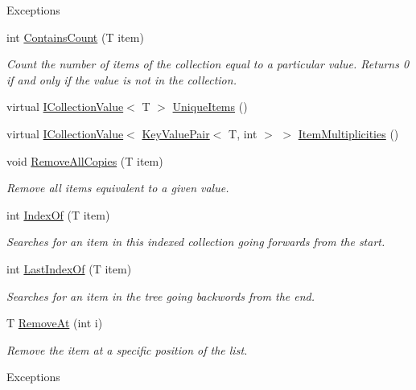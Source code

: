 \begin{DoxyCompactItemize}
\begin{DoxyCompactList}
\begin{DoxyExceptions}{Exceptions}
\hline
\end{DoxyExceptions}
\end{DoxyCompactList}\item 
int \hyperlink{class_c5_1_1_tree_bag_a3a7a0f7538cd89da7e9b10e3311bd521}{Contains\+Count} (T item)
\begin{DoxyCompactList}\small\item\em Count the number of items of the collection equal to a particular value. Returns 0 if and only if the value is not in the collection. \end{DoxyCompactList}\item 
virtual \hyperlink{interface_c5_1_1_i_collection_value}{I\+Collection\+Value}$<$ T $>$ \hyperlink{class_c5_1_1_tree_bag_abae751027448f33475f6fc68f53fa118}{Unique\+Items} ()
\item 
virtual \hyperlink{interface_c5_1_1_i_collection_value}{I\+Collection\+Value}$<$ \hyperlink{struct_c5_1_1_key_value_pair}{Key\+Value\+Pair}$<$ T, int $>$ $>$ \hyperlink{class_c5_1_1_tree_bag_a9a6a1f53ff0b1874f1936c960319f3ab}{Item\+Multiplicities} ()
\item 
void \hyperlink{class_c5_1_1_tree_bag_a9fd092cffe3ba3dba034ca1453a75819}{Remove\+All\+Copies} (T item)
\begin{DoxyCompactList}\small\item\em Remove all items equivalent to a given value. \end{DoxyCompactList}\item 
int \hyperlink{class_c5_1_1_tree_bag_ae70bb012099ffac0759c74b589fb811a}{Index\+Of} (T item)
\begin{DoxyCompactList}\small\item\em Searches for an item in this indexed collection going forwards from the start. \end{DoxyCompactList}\item 
int \hyperlink{class_c5_1_1_tree_bag_ad51c9faeac6e8262b8cfbb6baeba23d4}{Last\+Index\+Of} (T item)
\begin{DoxyCompactList}\small\item\em Searches for an item in the tree going backwords from the end. \end{DoxyCompactList}\item 
T \hyperlink{class_c5_1_1_tree_bag_afe0ad1fba513ec3b14e73e457230d87d}{Remove\+At} (int i)
\begin{DoxyCompactList}\small\item\em Remove the item at a specific position of the list. 
\begin{DoxyExceptions}{Exceptions}

\end{DoxyExceptions}
\end{DoxyCompactList}
\end{DoxyCompactItemize}
